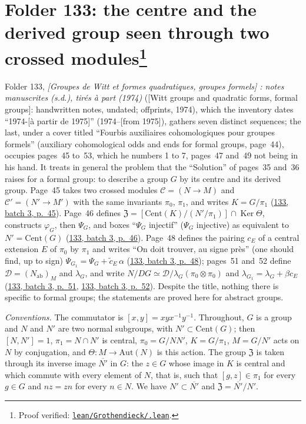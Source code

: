\documentclass[11pt]{article}
\newcommand{\q}[1]{“#1”}
\newcommand{\lot}[3]{\href{https://grothendieck.commutator.io/\##1/#2/p#3}{#1, batch #2, p.~#3}}
\newcommand{\verifie}[1]{\footnote{Proof verified: \href{https://github.com/Commutator-IO/grothendieck-project/blob/article-lean-2026-10/lean/Grothendieck/#1.lean}{\texttt{lean/Grothendieck/\detokenize{#1}.lean}}.}}
\theoremstyle{plain}
\theoremstyle{definition}
\theoremstyle{remark}
\begin{document}
\section[Folder 133: the centre and the derived group seen through two crossed modules]{Folder 133: the centre and the derived group seen through two crossed modules\protect\verifie{Folder133}}\label{sec:133}

Folder 133, \emph{[Groupes de Witt et formes quadratiques, groupes formels] : notes manuscrites (s.d.), tirés à part (1974)} ([Witt groups and quadratic forms, formal groups]: handwritten notes, undated; offprints, 1974), which the inventory dates \q{1974-[à partir de 1975]} (1974--[from 1975]), gathers seven distinct sequences; the last, under a cover titled \q{Fourbis auxiliaires cohomologiques pour groupes formels} (auxiliary cohomological odds and ends for formal groups, page~44), occupies pages~45 to~53, which he numbers 1 to 7, pages~47 and~49 not being in his hand. It treats in general the problem that the \q{Solution} of pages~35 and~36 raises for a formal group: to describe a group $G$ by its centre and its derived group. Page~45 takes two crossed modules $\mathcal C = (N \to M)$ and $\mathcal C' = (N' \to M')$ with the same invariants $\pi_0$, $\pi_1$, and writes $K = G/\pi_1$ (\lot{133}{3}{45}). Page~46 defines $\mathfrak Z = [\mathrm{Cent}(K)/(N'/\pi_1)] \cap \operatorname{Ker}\Theta$, constructs $\varphi_G$, then $\Psi_G$, and boxes \q{$\Psi_G$ injectif} ($\Psi_G$ injective) as equivalent to $N' = \mathrm{Cent}(G)$ (\lot{133}{3}{46}). Page~48 defines the pairing $c_E$ of a central extension $E$ of $\pi_0$ by $\pi_1$ and writes \q{On doit trouver, au signe près} (one should find, up to sign) $\Psi_{G_1} = \Psi_G + \tilde c_E\,\alpha$ (\lot{133}{3}{48}); pages~51 and~52 define $\mathcal D = (N_{\mathrm{ab}})_M$ and $\lambda_G$, and write $N/DG \simeq \mathcal D/\lambda_G(\pi_0 \otimes \pi_0)$ and $\lambda_{G_1} = \lambda_G + \beta c_E$ (\lot{133}{3}{51}, \lot{133}{3}{52}). Despite the title, nothing there is specific to formal groups; the statements are proved here for abstract groups.

\noindent\emph{Conventions.} The commutator is $[x, y] = xyx^{-1}y^{-1}$. Throughout, $G$ is a group and $N$ and $N'$ are two normal subgroups, with $N' \subset \mathrm{Cent}(G)$; then $[N, N'] = 1$, $\pi_1 = N \cap N'$ is central, $\pi_0 = G/NN'$, $K = G/\pi_1$, $M = G/N'$ acts on $N$ by conjugation, and $\Theta : M \to \mathrm{Aut}(N)$ is this action. The group $\mathfrak Z$ is taken through its inverse image $\overline{N'}$ in $G$: the $z \in G$ whose image in $K$ is central and which commute with every element of $N$, that is, such that $[g, z] \in \pi_1$ for every $g \in G$ and $nz = zn$ for every $n \in N$. We have $N' \subset \overline{N'}$ and $\mathfrak Z = \overline{N'}/N'$.
\end{document}
